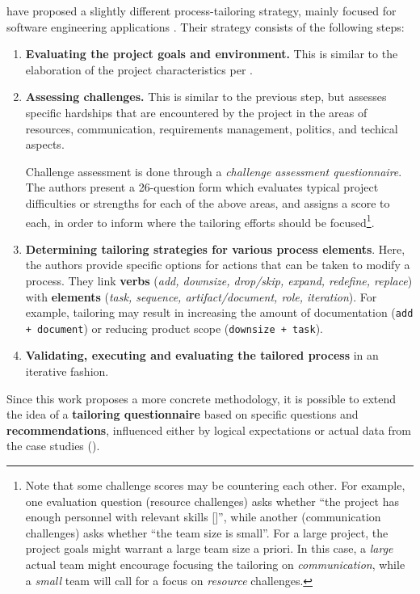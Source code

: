 \documentclass[a4paper,nobib,justified,final]{tufte-book}
\begin{document}
\citeauthor{xuUsingProcessTailoring2008} have proposed a slightly different process-tailoring strategy, mainly focused for software engineering applications \autocite{xuUsingProcessTailoring2008}.
Their strategy consists of the following steps:
\begin{enumerate}[itemsep=-1ex]
	\item \textbf{Evaluating the project goals and environment.} This is similar to the elaboration of the project characteristics per \citeauthor{kalusCriteriaSoftwareProcess2013} \cite{kalusCriteriaSoftwareProcess2013}.
	\item \textbf{Assessing challenges.}  This is similar to the previous step, but assesses specific hardships that are encountered by the project in the areas of resources, communication, requirements management, politics, and techical aspects.
	
	Challenge assessment is done through a \emph{challenge assessment questionnaire}. The authors present a 26-question form which evaluates typical project difficulties or strengths for each of the above areas, and assigns a score to each, in order to inform where the tailoring efforts should be focused\footnote{Note that some challenge scores may be countering each other. For example, one evaluation question (resource challenges) asks whether ``the project has enough personnel with relevant skills [\textellipsis]'', while another (communication challenges) asks whether ``the team size is small''.
	For a large project, the project goals might warrant a large team size a priori. In this case, a \emph{large} actual team might encourage focusing the tailoring on \emph{communication}, while a \emph{small} team will call for a focus on \emph{resource} challenges.
	}.
	\item \textbf{Determining tailoring strategies for various process elements}.
	Here, the authors provide specific options for actions that can be taken to modify a process.
	They link \textbf{verbs} (\emph{add, downsize, drop/skip, expand, redefine, replace}) with \textbf{elements} (\emph{task, sequence, artifact/document, role, iteration}).
	For example, tailoring may result in increasing the amount of documentation (\texttt{add + document}) or reducing product scope (\texttt{downsize + task}).
	\item \textbf{Validating, executing and evaluating the tailored process} in an iterative fashion.
\end{enumerate}

Since this work proposes a more concrete methodology, it is possible to extend the idea of a \textbf{tailoring questionnaire} based on specific questions and \textbf{recommendations}, influenced either by logical expectations or actual data from the case studies ().
\end{document}
